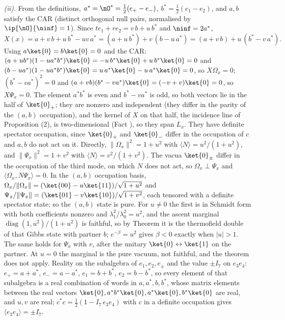 \emph{(ii).} From the definitions, $a^{*} = \nO^{*} = \tfrac12(e_{+} - e_{-})$, $b^{*} = \tfrac12(e_{1} - e_{2})$, and $a, b$ satisfy the CAR (distinct orthogonal null pairs, normalised by $\ip{\nO}{\ninf} = 1$). Since $t e_{1} + r e_{2} = v\,b + u\,b^{*}$ and $\ninf = 2a^{*}$,
\[
X(x) = a + v\,b + u\,b^{*} - uv\,a^{*} = (a + u\,b^{*}) + v\,(b - u\,a^{*}) = (a + v\,b) + u\,(b^{*} - v\,a^{*}) .
\]
Using $a\ket{0} = b\ket{0} = 0$ and the CAR: $(a + u b^{*})(1 - u a^{*}b^{*})\ket{0} = -u\,b^{*}\ket{0} + u\,b^{*}\ket{0} = 0$ and $(b - u a^{*})(1 - u a^{*}b^{*})\ket{0} = u\,a^{*}\ket{0} - u\,a^{*}\ket{0} = 0$, so $X\Omega_{x} = 0$; $(b^{*} - v a^{*})^{2} = 0$ and $(a + v b)(b^{*} - v a^{*})\ket{0} = (-v + v)\ket{0} = 0$, so $X\Psi_{x} = 0$. The element $a^{*}b^{*}$ is even and $b^{*} - v a^{*}$ is odd, so both vectors lie in the half of $\ket{0}_{+}$; they are nonzero and independent (they differ in the parity of the $(a,b)$ occupation), and the kernel of $X$ on that half, the incidence line of Proposition (2), is two-dimensional (Fact ), so they span $L_{x}$. They have definite spectator occupation, since $\ket{0}_{+}$ and $\ket{0}_{-}$ differ in the occupation of $c$ and $a, b$ do not act on it. Directly, $\|\Omega_{x}\|^{2} = 1 + u^{2}$ with $\langle N \rangle = u^{2}/(1 + u^{2})$, and $\|\Psi_{x}\|^{2} = 1 + v^{2}$ with $\langle N \rangle = v^{2}/(1 + v^{2})$. The vacua $\ket{0}_{\pm}$ differ in the occupation of the third mode, on which $N$ does not act, so $\Omega_{x} \perp \Psi_{x}$ and $\langle \Omega_{x}, N\Psi_{x}\rangle = 0$. In the $(a, b)$ occupation basis, $\Omega_{x}/\|\Omega_{x}\| = (\ket{00} - u\ket{11})/\sqrt{1 + u^{2}}$ and $\Psi_{x}/\|\Psi_{x}\| = (\ket{01} - v\ket{10})/\sqrt{1 + v^{2}}$, each tensored with a definite spectator state; so the $(a,b)$ state is pure. For $u \ne 0$ the first is in Schmidt form with both coefficients nonzero and $\lambda_{1}^{2}/\lambda_{0}^{2} = u^{2}$, and the ascent marginal $\operatorname{diag}(1, u^{2})/(1 + u^{2})$ is faithful, so by Theorem  it is the thermofield double of that Gibbs state with partner $b$; $e^{-\beta} = u^{2}$ gives $\beta < 0$ exactly when $|u| > 1$. The same holds for $\Psi_{x}$ with $v$, after the unitary $\ket{0} \leftrightarrow \ket{1}$ on the partner. At $u = 0$ the marginal is the pure vacuum, not faithful, and the theorem does not apply. Reality on the subalgebra of $e_{1}, e_{2}, e_{\pm}$ and the value $\pm I_{7}$ on $e_{3}e_{4}$: $e_{+} = a + a^{*}$, $e_{-} = a - a^{*}$, $e_{1} = b + b^{*}$, $e_{2} = b - b^{*}$, so every element of that subalgebra is a real combination of words in $a, a^{*}, b, b^{*}$, whose matrix elements between the real vectors $\ket{0}, a^{*}b^{*}\ket{0}, a^{*}\ket{0}, b^{*}\ket{0}$ are real, and $u, v$ are real; $c^{*}c = \tfrac12(1 - I_{7}\,e_{3}e_{4})$ with $c$ in a definite occupation gives $\langle e_{3}e_{4} \rangle = \pm I_{7}$.

